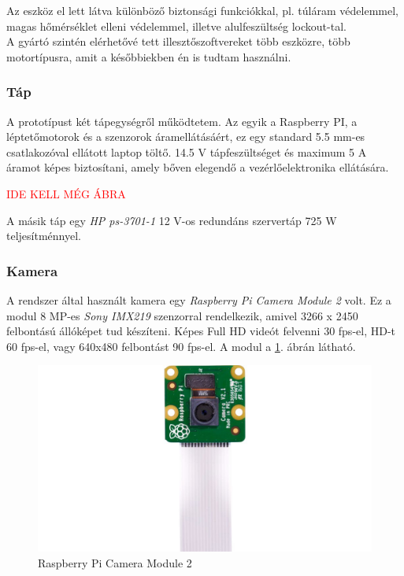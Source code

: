 \documentclass[12pt,a4paper]{article}
\newcommand{\ABRAKELL}{\textcolor{red}{IDE KELL MÉG ÁBRA}}
\begin{document}
Az eszköz el lett látva különböző biztonsági funkciókkal, pl. túláram védelemmel, magas hőmérséklet elleni védelemmel, illetve alulfeszültség lockout-tal.\\

A gyártó szintén elérhetővé tett illesztőszoftvereket több eszközre, több motortípusra, amit a későbbiekben én is tudtam használni.

\subsubsection*{Táp}

A prototípust két tápegységről működtetem. Az egyik a Raspberry PI, a léptetőmotorok és a szenzorok áramellátásáért, ez egy standard 5.5 mm-es csatlakozóval ellátott laptop töltő. 14.5 V tápfeszültséget és maximum 5 A áramot képes biztosítani, amely bőven elegendő a vezérlőelektronika ellátására.

\ABRAKELL

A másik táp egy \textsl{HP ps-3701-1} 12 V-os redundáns szervertáp 725 W teljesítménnyel. 

\subsubsection*{Kamera}
A rendszer által használt kamera egy \textsl{Raspberry Pi Camera Module 2} volt.\cite{raspberrycam} Ez a modul 8 MP-es \textsl{Sony IMX219} szenzorral rendelkezik, amivel 3266 x 2450 felbontású állóképet tud készíteni. Képes Full HD videót felvenni 30 fps-el, HD-t 60 fps-el, vagy 640x480 felbontást 90 fps-el. A modul a \ref{fig:elek_raspberrycam}. ábrán látható.

\begin{figure}[h!]
	\centering
	\includegraphics[width=1\linewidth]{elek_raspberrycam}
	\caption{Raspberry Pi Camera Module 2}
	\label{fig:elek_raspberrycam}
\end{figure}
\end{document}
